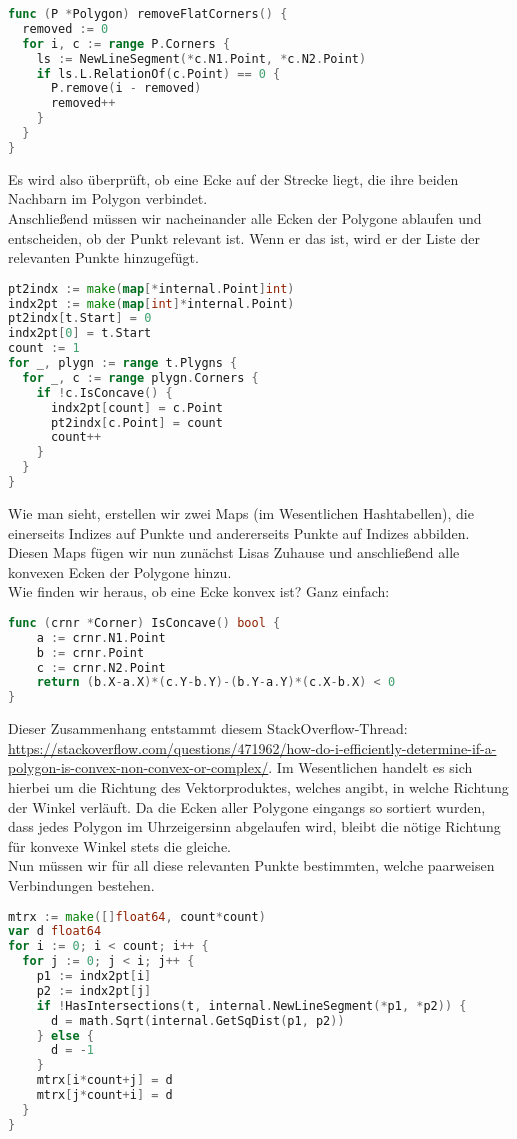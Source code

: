 \documentclass[a4paper,10pt,ngerman]{scrartcl}
\begin{document}
\begin{lstlisting}[language=go]
func (P *Polygon) removeFlatCorners() {
  removed := 0
  for i, c := range P.Corners {
    ls := NewLineSegment(*c.N1.Point, *c.N2.Point)
    if ls.L.RelationOf(c.Point) == 0 {
      P.remove(i - removed)
      removed++
    }
  }
}
\end{lstlisting}
Es wird also überprüft, ob eine Ecke auf der Strecke liegt, die ihre beiden Nachbarn im Polygon verbindet.\\
Anschlie\ss end müssen wir nacheinander alle Ecken der Polygone ablaufen und entscheiden, ob der Punkt relevant ist. Wenn er das ist, wird er der Liste der relevanten Punkte hinzugefügt. 
\begin{lstlisting}[language=go]
pt2indx := make(map[*internal.Point]int)
indx2pt := make(map[int]*internal.Point)
pt2indx[t.Start] = 0
indx2pt[0] = t.Start
count := 1
for _, plygn := range t.Plygns {
  for _, c := range plygn.Corners {
    if !c.IsConcave() {
      indx2pt[count] = c.Point
      pt2indx[c.Point] = count
      count++
    }
  }
}
\end{lstlisting}
Wie man sieht, erstellen wir zwei Maps (im Wesentlichen Hashtabellen), die einerseits Indizes auf Punkte und andererseits Punkte auf Indizes abbilden. Diesen Maps fügen wir nun zunächst Lisas Zuhause und anschlie\ss end alle konvexen Ecken der Polygone hinzu.\\
Wie finden wir heraus, ob eine Ecke konvex ist? Ganz einfach:
\begin{lstlisting}[language=go]
func (crnr *Corner) IsConcave() bool {
	a := crnr.N1.Point
	b := crnr.Point
	c := crnr.N2.Point
	return (b.X-a.X)*(c.Y-b.Y)-(b.Y-a.Y)*(c.X-b.X) < 0
}
\end{lstlisting}
Dieser Zusammenhang entstammt diesem StackOverflow-Thread: \url{https://stackoverflow.com/questions/471962/how-do-i-efficiently-determine-if-a-polygon-is-convex-non-convex-or-complex/}. Im Wesentlichen handelt es sich hierbei um die Richtung des Vektorproduktes, welches angibt, in welche Richtung der Winkel verläuft. Da die Ecken aller Polygone eingangs so sortiert wurden, dass jedes Polygon im Uhrzeigersinn abgelaufen wird, bleibt die nötige Richtung für konvexe Winkel stets die gleiche.\\
Nun müssen wir für all diese relevanten Punkte bestimmten, welche paarweisen Verbindungen bestehen.
\begin{lstlisting}[language=go]
mtrx := make([]float64, count*count)
var d float64
for i := 0; i < count; i++ {
  for j := 0; j < i; j++ {
    p1 := indx2pt[i]
    p2 := indx2pt[j]
    if !HasIntersections(t, internal.NewLineSegment(*p1, *p2)) {
      d = math.Sqrt(internal.GetSqDist(p1, p2))
    } else {
      d = -1
    }
    mtrx[i*count+j] = d
    mtrx[j*count+i] = d
  }
}
\end{lstlisting}
\end{document}
